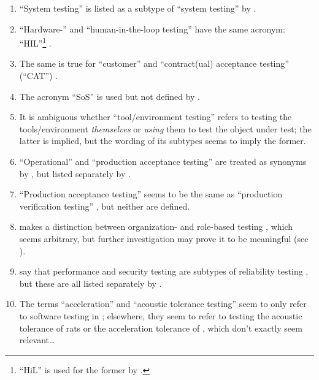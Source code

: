 \begin{enumerate}
      \item ``System testing'' is listed as a subtype of ``system testing'' by
            \citet[p.~23]{Firesmith2015}.
      \item ``Hardware-'' and ``human-in-the-loop testing'' have the same
            acronym: ``HIL''\footnote{``HiL'' is used for the former by
                  \citet[p.~2]{PreußeEtAl2012}.} \citep[p.~23]{Firesmith2015}.
      \item The same is true for ``customer'' and ``contract(ual) acceptance
            testing'' (``CAT'') \citep[p.~30]{Firesmith2015}.
      \item The acronym ``SoS'' is used but not defined by
            \citet[p.~23]{Firesmith2015}.
      \item It is ambiguous whether ``tool/environment testing'' refers to
            testing the tools/environment \emph{themselves} or \emph{using}
            them to test the object under test; the latter is implied, but the
            wording of its subtypes \citep[p.~25]{Firesmith2015} seems to imply
            the former.
      \item ``Operational'' and ``production acceptance testing'' are treated
            as synonyms by , but listed separately by
            \citet[p.~30]{Firesmith2015}.
      \item ``Production acceptance testing'' \citep[p.~30]{Firesmith2015}
            seems to be the same as ``production verification testing''
            \citep[p.~22]{IEEE2022}, but neither are defined.
      \item \citeauthor{Firesmith2015} makes a distinction between organization-
            and role-based testing \citeyearpar[pp.~17,~37,~39]{Firesmith2015},
            which seems arbitrary, but further investigation may prove it to be
            meaningful (see ).
      \item \citeauthor{ISO_IEC2023a} say that performance and security testing
            are subtypes of reliability testing \citeyearpar{ISO_IEC2023a}, but
            these are all listed separately by \citet[p.~53]{Firesmith2015}.
      \item The terms ``acceleration'' and ``acoustic tolerance testing'' seem
            to only refer to software testing in \citep[p.~56]{Firesmith2015};
            elsewhere, they seem to refer to testing the acoustic tolerance of
            rats \citep{HolleyEtAl1996} or the acceleration tolerance of
            \accelTolTest{}, which don't exactly seem relevant\dots

\end{enumerate}
